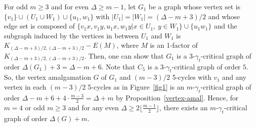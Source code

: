 \documentclass[12pt]{amsart}
\begin{document}
For odd $m \ge 3$ and for even $\Delta \ge m-1$, let $G_1$ be a
graph  whose vertex set is $\{v_1\} \cup (U_1 \cup W_1) \cup
\{u_1,w_1 \}$ with $|U_1|=|W_1|=(\Delta-m+3)/2$ and whose edge set
is composed of $\{v_1x, v_1y, u_1x, w_1y  | x \in U_1 ,\  y \in
W_1 \} \cup\{u_1w_1 \}$ and the subgraph induced by the vertices in between $U_1$ and $W_1$
 is $K_{(\Delta-m+3)/2,
(\Delta-m+3)/2}-E(M)$, where $M$ is an 1-factor of $K_{(\Delta-m+3)/2,
(\Delta-m+3)/2}$. Then, one can show that $G_1$
is a $3$-$\gamma_t$-critical graph of order $\Delta (G_1)+3=
\Delta-m+6$. Note that $C_5$ is a $3$-$\gamma_t$-critical graph
of order $5$. So, the vertex amalgamation $G$ of $G_1$ and
$(m-3)/2$  5-cycles  with $v_1$ and any vertex in each $(m-3)/2$
5-cycles as in Figure~\ref{fig1} is an $m$-$\gamma_t$-critical graph of order $\Delta-m+6
+ 4\cdot \frac{m-3}{2}=\Delta+m$ by Proposition~\ref{vertex-amal}.
Hence, for $m=4$ or odd $m \ge 3$ and for any even $\Delta \ge
2\lfloor \frac{m-1}{2}\rfloor$, there exists an
$m$-$\gamma_t$-critical graph of order $\Delta (G)+m$.
\end{document}
